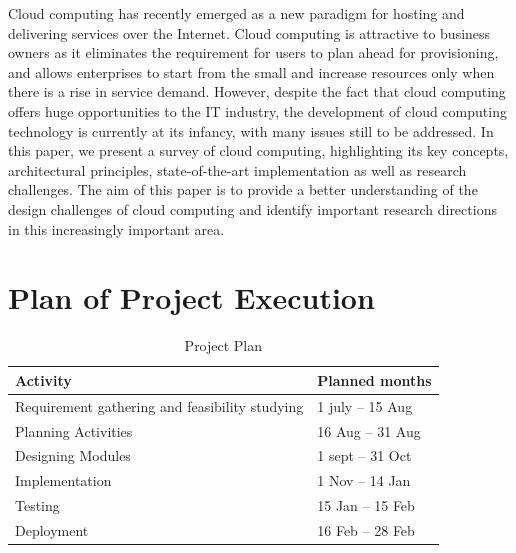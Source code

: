\documentclass[oneside,a4paper,12pt]{report}
\begin{document}
\begin{enumerate}
Cloud computing has recently emerged as a new paradigm for hosting and delivering services over the Internet. Cloud computing is attractive to business owners as it eliminates the requirement for users to plan ahead for provisioning, and allows enterprises to start from the small and increase resources only when there is a rise in service demand. However, despite the fact that cloud computing offers huge opportunities to the IT industry, the development of cloud computing technology is currently at its infancy, with many issues still to be addressed. In this paper, we present a survey of cloud computing, highlighting its key concepts, architectural principles, state-of-the-art implementation as well as research challenges. The aim of this paper is to provide a better understanding of the design challenges of cloud computing and identify important research directions in this increasingly important area.\\
\end{enumerate}   

\section{Plan of Project Execution}

\begin{table}[!htbp]
\begin{center}
\def\arraystretch{1.5}
\begin{tabularx}{\textwidth}{| X | X |}
\hline
Activity	& Planned months\\
\hline
Requirement gathering and feasibility studying        &1 july – 15 Aug\\
\hline
Planning Activities       &16 Aug – 31 Aug\\
\hline
Designing Modules        &1 sept – 31 Oct\\
\hline
Implementation           &1 Nov – 14 Jan\\
\hline
Testing                  &15 Jan – 15 Feb\\
\hline
Deployment               &16 Feb – 28 Feb\\
\hline



\end{tabularx}
\end{center}
\caption{Project Plan}
\label{tab:usecase}
\end{table}
\end{document}
